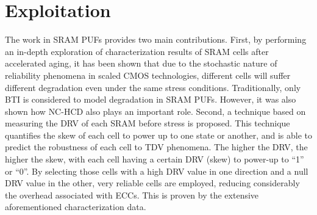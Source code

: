 \section{Exploitation}
The work in \gls{SRAM} \glspl{PUF} \cite{saraza-canflancaImprovingReliabilitySRAMbased2021, santana-andreoDRVbasedBitSelection2022, santana-andreoReliabilityImprovementSRAM2024a} provides two main contributions. First, by performing an in-depth exploration of characterization results of \gls{SRAM} cells after accelerated aging, it has been shown that due to the stochastic nature of reliability phenomena in scaled CMOS technologies, different cells will suffer different degradation even under the same stress conditions. Traditionally, only \gls{BTI} is considered to model degradation in \gls{SRAM} \glspl{PUF}. However, it was also shown how \gls{NC-HCD} also plays an important role. Second, a technique based on measuring the \gls{DRV} of each \gls{SRAM} before stress is proposed. This technique quantifies the skew of each cell to power up to one state or another, and is able to predict the robustness of each cell to \gls{TDV} phenomena. The higher the \gls{DRV}, the higher the skew, with each cell having a certain \gls{DRV} (skew) to power-up to ``1'' or ``0''. By selecting those cells with a high \gls{DRV} value in one direction and a null \gls{DRV} value in the other, very reliable cells are employed, reducing considerably the overhead associated with \glspl{ECC}. This is proven by the extensive aforementioned characterization data. 